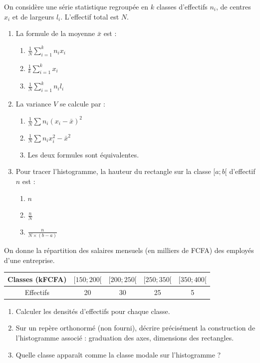\documentclass[11pt]{article}
\begin{document}
\begin{exercice}
On considère une série statistique regroupée en $k$ classes d'effectifs $n_i$, de centres $x_i$ et de largeurs $l_i$. L'effectif total est $N$.
\begin{enumerate}
    \item La formule de la moyenne $\bar{x}$ est :
    \begin{enumerate}
        \item $\frac{1}{N}\sum_{i=1}^{k} n_i x_i$
        \item $\frac{1}{k}\sum_{i=1}^{k} x_i$
        \item $\frac{1}{N}\sum_{i=1}^{k} n_i l_i$
    \end{enumerate}
    \item La variance $V$ se calcule par :
    \begin{enumerate}
        \item $\frac{1}{N}\sum n_i (x_i - \bar{x})^2$
        \item $\frac{1}{N}\sum n_i x_i^2 - \bar{x}^2$
        \item Les deux formules sont équivalentes.
    \end{enumerate}
    \item Pour tracer l'histogramme, la hauteur du rectangle sur la classe $[a;b[$ d'effectif $n$ est :
    \begin{enumerate}
        \item $n$
        \item $\frac{n}{N}$
        \item $\frac{n}{N \times (b-a)}$
    \end{enumerate}
\end{enumerate}
\end{exercice}

\begin{exercice}
On donne la répartition des salaires mensuels (en milliers de FCFA) des employés d'une entreprise.
\begin{center}
\begin{tabular}{|c|c|c|c|c|}
\hline
Classes (kFCFA) & $[150;200[$ & $[200;250[$ & $[250;350[$ & $[350;400[$ \\ \hline
Effectifs & 20 & 30 & 25 & 5 \\ \hline
\end{tabular}
\end{center}
\begin{enumerate}
    \item Calculer les densités d'effectifs pour chaque classe.
    \item Sur un repère orthonormé (non fourni), décrire précisément la construction de l'histogramme associé : graduation des axes, dimensions des rectangles.
    \item Quelle classe apparaît comme la classe modale sur l'histogramme ?
\end{enumerate}
\end{exercice}
\end{document}
